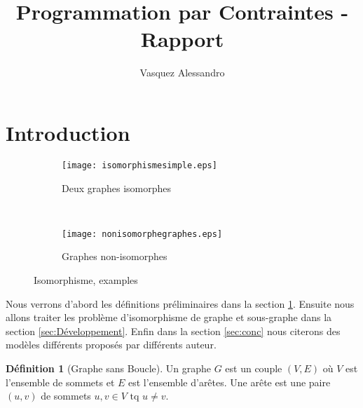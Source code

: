 \documentclass[french]{article}
\theoremstyle{definition}
\newtheorem{deff}{D\'efinition}[section]
\theoremstyle{remark}
\begin{document}
	\title{Programmation par Contraintes - Rapport}
	\author{Vasquez Alessandro}
	\maketitle
	\newpage
	\tableofcontents
	\newpage
\section{Introduction}
\label{sec:intro}
\begin{figure*}[t!]
	\begin{subfigure}[t]{0.5\textwidth}
		\centering
		\texttt{[image: isomorphismesimple.eps]}
		\caption{\label{fig:isographstar}Deux graphes isomorphes}
	\end{subfigure}%
	~ 
	\begin{subfigure}[t]{0.5\textwidth}
		\centering
		\texttt{[image: nonisomorphegraphes.eps]}
		\caption{\label{fig:nonisograph}Graphes  non-isomorphes}
	\end{subfigure}
	\caption{Isomorphisme, examples}
\end{figure*}

Nous verrons d'abord les définitions préliminaires dans la section \ref{sec:intro}. Ensuite nous allons traiter les problème d'isomorphisme de graphe et sous-graphe dans la section \ref{sec:Développement}. 
Enfin dans la section \ref{sec:conc} nous citerons des modèles différents proposés par différents auteur. 

\begin{deff}[Graphe sans Boucle]
	Un graphe $G$ est un couple $(V,E)$ où $V$ est l'ensemble de sommets et $E$ est l'ensemble d'arêtes. Une arête est une paire $(u,v)$ de sommets $u,v \in V \text{ tq } u \neq v.$
	
\end{deff}
\end{document}
